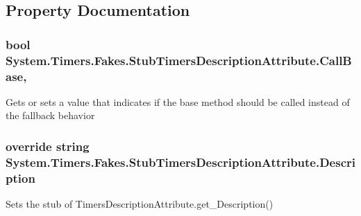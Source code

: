\subsection{Property Documentation}
\hypertarget{class_system_1_1_timers_1_1_fakes_1_1_stub_timers_description_attribute_a1267693c86b4b94bf2de431b9667024c}{
\subsubsection[{Call\-Base}]{\setlength{\rightskip}{0pt plus 5cm}bool System.\-Timers.\-Fakes.\-Stub\-Timers\-Description\-Attribute.\-Call\-Base\hspace{0.3cm}{\ttfamily [get]}, {\ttfamily [set]}}}\label{class_system_1_1_timers_1_1_fakes_1_1_stub_timers_description_attribute_a1267693c86b4b94bf2de431b9667024c}


Gets or sets a value that indicates if the base method should be called instead of the fallback behavior

\hypertarget{class_system_1_1_timers_1_1_fakes_1_1_stub_timers_description_attribute_ae6722f92b91a611c191eaf44e0074fd7}{
\subsubsection[{Description}]{\setlength{\rightskip}{0pt plus 5cm}override string System.\-Timers.\-Fakes.\-Stub\-Timers\-Description\-Attribute.\-Description\hspace{0.3cm}{\ttfamily [get]}}}\label{class_system_1_1_timers_1_1_fakes_1_1_stub_timers_description_attribute_ae6722f92b91a611c191eaf44e0074fd7}


Sets the stub of Timers\-Description\-Attribute.\-get\-\_\-\-Description()

